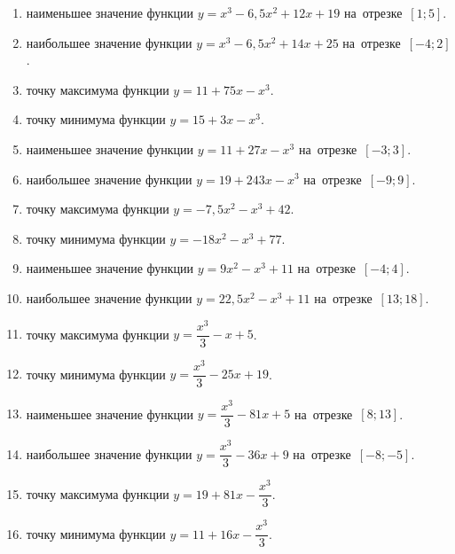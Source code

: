 \documentclass[a4paper,10pt]{article}
\begin{document}
\begin{enumerate}
\item {} наименьшее значение функции $y=x^3 -6,5x^2+12x+19$ на~отрезке~$\left[1;5\right]$.

\item {} наибольшее значение функции $y=x^3 -6,5x^2+14x+25$ на~отрезке~$\left[-4;2\right]$.

\item {} точку максимума функции $y=11+75x-x^3$.

\item {} точку минимума функции $y=15+3x-x^3$.

\item {} наименьшее значение функции $y=11+27x-x^3$ на~отрезке~$\left[-3;3\right]$.

\item {} наибольшее значение функции $y=19+243x-x^3$ на~отрезке~$\left[-9;9\right]$.

\item {} точку максимума функции $y=-7,5x^2-x^3+42$.

\item {} точку минимума функции $y=-18x^2-x^3+77$.

\item {} наименьшее значение функции $y=9x^2-x^3+11$ на~отрезке~$\left[-4;4\right]$.

\item {} наибольшее значение функции $y=22,5x^2-x^3+11$ на~отрезке~$\left[13;18\right]$.

\item {} точку максимума функции $y=\dfrac{x^3}{3} -x+5$.

\item {} точку минимума функции $y=\dfrac{x^3}{3} -25x+19$.

\item {} наименьшее значение функции $y=\dfrac{x^3}{3} -81x+5$ на~отрезке~$\left[8;13\right]$.

\item {} наибольшее значение функции $y=\dfrac{x^3}{3} -36x+9$ на~отрезке~$\left[-8;-5\right]$.

\item {} точку максимума функции $y=19 +81x-\dfrac{x^3}{3}$.

\item {} точку минимума функции $y=11 +16x-\dfrac{x^3}{3}$.


\end{enumerate}
\end{document}
